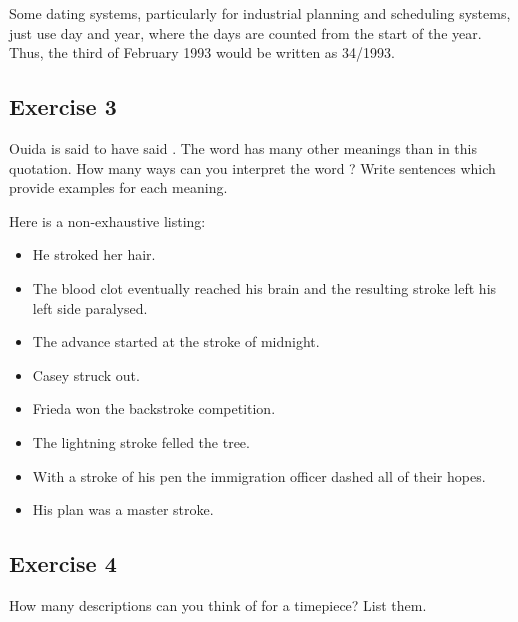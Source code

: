 \documentclass{article}
\begin{document}
   Some dating systems, particularly for industrial planning and scheduling
systems, just use day and year, where the days are counted from the start of
the year. Thus, the third of February 1993 would be written as 34/1993.

\subsection{Exercise 3}

\begin{itshape}
 Ouida is said to have said .
      The word  has many other meanings than in this quotation. 
      How many ways can you interpret the word ? 
      Write sentences which provide examples for each meaning.
\end{itshape}

    Here is a non-exhaustive listing:
\begin{itemize}
\item He stroked her hair.
\item The blood clot eventually reached his brain and the resulting stroke 
      left his left side paralysed.
\item The advance started at the stroke of midnight.
\item Casey struck out.
\item Frieda won the backstroke competition.
\item The lightning stroke felled the tree.
\item With a stroke of his pen the immigration officer dashed all of 
      their hopes.
\item His plan was a master stroke.
\end{itemize}

\subsection{Exercise 4}

\begin{itshape}
 How many descriptions can you think of for a timepiece? List them.
\end{itshape}
\end{document}
